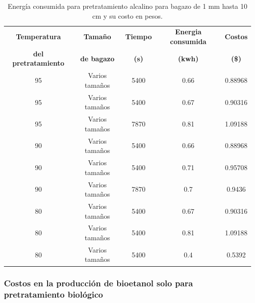 \documentclass[12pt]{article}
\begin{document}
\begin{table}[H]
	\centering
	\caption{Energía consumida para pretratamiento alcalino para bagazo de 1 mm hasta 10 cm y su costo en pesos. }
	\label{tabla costo varios}
	\resizebox{12cm}{!} {
	\begin{tabular}{|c|c|c|c|c|}
		\hline
		\textbf{Temperatura} & \textbf{Tamaño } & \textbf{Tiempo} & \textbf{Energia consumida} & \textbf{Costos } \\ 
		\textbf{del pretratamiento} &	\textbf{ de bagazo}  &	\textbf{ (s)} & 	\textbf{(kwh) }& 	\textbf{(\$)} \\ \hline
	95 & Varios tamaños & 5400 & 0.66 & 0.88968  \\ \hline
	95 & Varios tamaños & 5400 & 0.67 & 0.90316  \\ \hline
	95 & Varios tamaños & 7870 & 0.81 & 1.09188  \\ \hline
	90 & Varios tamaños & 5400 & 0.66 & 0.88968  \\ \hline
	90 & Varios tamaños & 5400 & 0.71 & 0.95708  \\ \hline
	90 & Varios tamaños & 7870 & 0.7  & 0.9436  \\ \hline
	80 & Varios tamaños & 5400 & 0.67 & 0.90316  \\ \hline
	80 & Varios tamaños & 5400 & 0.81 & 1.09188  \\ \hline
	80 & Varios tamaños & 5400 & 0.4  & 0.5392  \\ \hline
		
		
	\end{tabular}}

\end{table}



	 \subsubsection{Costos en la producción de bioetanol solo para pretratamiento biológico}
			
\end{document}
